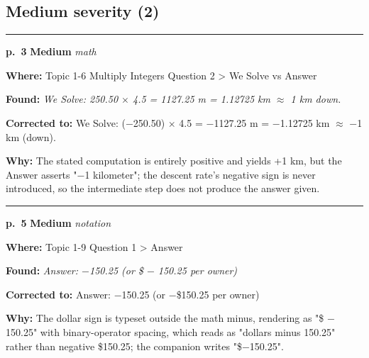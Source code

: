 \documentclass[11pt]{article}
\newcommand{\sevmed}[1]{\textcolor{orange!80!black}{\textbf{#1}}}
\begin{document}
\subsection*{Medium severity (2)}
\noindent\rule{\textwidth}{0.4pt}\par\nobreak\vspace{2pt}
\noindent\textbf{p.~3} \quad \sevmed{Medium} \quad \textit{math}\par
\noindent\textbf{Where: }Topic 1-6 Multiply Integers Question 2 > We Solve vs Answer\par
\noindent\textbf{Found: }\textit{We Solve: 250.50 $\times$ 4.5 = 1127.25 m = 1.12725 km $\approx$ 1 km down.}\par
\noindent\textbf{Corrected to: }We Solve: ($-$250.50) $\times$ 4.5 = $-$1127.25 m = $-$1.12725 km $\approx$ $-$1 km (down).\par
\noindent\textbf{Why: }The stated computation is entirely positive and yields +1 km, but the Answer asserts "$-$1 kilometer"; the descent rate's negative sign is never introduced, so the intermediate step does not produce the answer given.\par\vspace{4pt}
\noindent\rule{\textwidth}{0.4pt}\par\nobreak\vspace{2pt}
\noindent\textbf{p.~5} \quad \sevmed{Medium} \quad \textit{notation}\par
\noindent\textbf{Where: }Topic 1-9 Question 1 > Answer\par
\noindent\textbf{Found: }\textit{Answer: $-$150.25 (or \$ $-$ 150.25 per owner)}\par
\noindent\textbf{Corrected to: }Answer: $-$150.25 (or $-$\$150.25 per owner)\par
\noindent\textbf{Why: }The dollar sign is typeset outside the math minus, rendering as "\$ $-$ 150.25" with binary-operator spacing, which reads as "dollars minus 150.25" rather than negative \$150.25; the companion writes "\$$-$150.25".\par\vspace{4pt}
\end{document}
